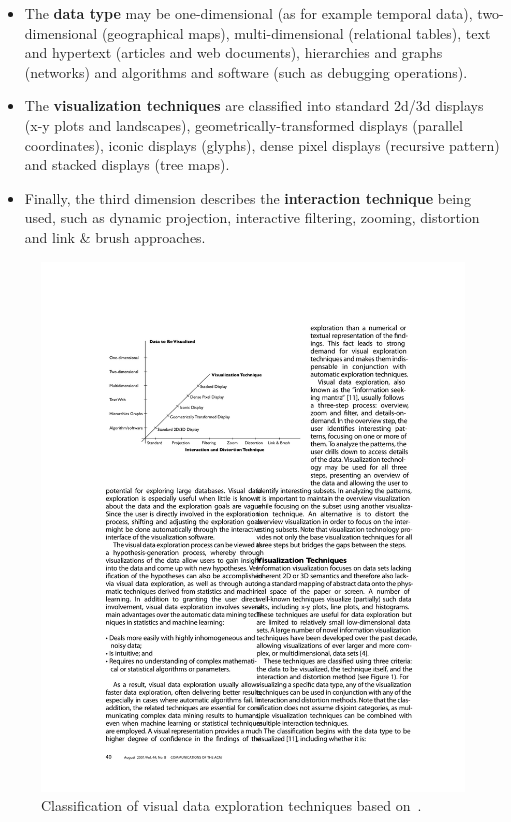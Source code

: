 \begin{itemize}

\item The \textbf{data type} may be one-dimensional (as for example temporal data), two-dimensional (geographical maps), multi-dimensional (relational tables), text and hypertext (articles and web documents), hierarchies and graphs (networks) and algorithms and software (such as debugging operations).

\item The \textbf{visualization techniques} are classified into standard 2d/3d displays (x-y plots and landscapes), geometrically-transformed displays (parallel coordinates), iconic displays (glyphs), dense pixel displays (recursive pattern) and stacked displays (tree maps).

\item Finally, the third dimension describes the \textbf{interaction technique} being used, such as dynamic projection, interactive filtering, zooming, distortion and link \& brush approaches.

\end{itemize}

\begin{figure}[h]
  \begin{center}
    \includegraphics[width=1\textwidth]{figures/classes_visual_techniques.pdf}
    \caption{Classification of visual data exploration techniques based on~\cite{keim2001vis}.}
    \label{fig:visual-techniques}
  \end{center}
\end{figure}



